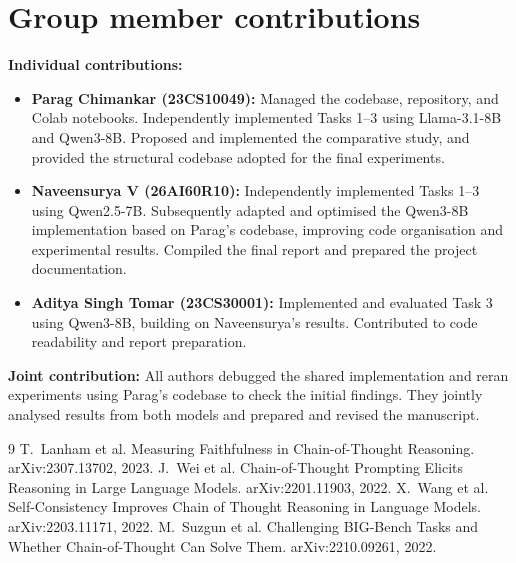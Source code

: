 \documentclass[11pt,a4paper]{article}
\begin{document}
\section*{Group member contributions}
\noindent\textbf{Individual contributions:}
\begin{itemize}
	\item \textbf{Parag Chimankar (23CS10049):} Managed the codebase, repository, and Colab notebooks. Independently implemented Tasks 1--3 using Llama-3.1-8B and Qwen3-8B. Proposed and implemented the comparative study, and provided the structural codebase adopted for the final experiments.
	
	\item \textbf{Naveensurya V (26AI60R10):} Independently implemented Tasks 1--3 using Qwen2.5-7B. Subsequently adapted and optimised the Qwen3-8B implementation based on Parag's codebase, improving code organisation and experimental results. Compiled the final report and prepared the project documentation.
	
	\item \textbf{Aditya Singh Tomar (23CS30001):} Implemented and evaluated Task 3 using Qwen3-8B, building on Naveensurya's results. Contributed to code readability and report preparation.
\end{itemize}
\noindent\textbf{Joint contribution:} All authors debugged the shared implementation and reran experiments using Parag's codebase to check the initial findings. They jointly analysed results from both models and prepared and revised the manuscript.

\begin{thebibliography}{9}
 T.~Lanham et al. Measuring Faithfulness in Chain-of-Thought Reasoning. arXiv:2307.13702, 2023.
 J.~Wei et al. Chain-of-Thought Prompting Elicits Reasoning in Large Language Models. arXiv:2201.11903, 2022.
 X.~Wang et al. Self-Consistency Improves Chain of Thought Reasoning in Language Models. arXiv:2203.11171, 2022.
 M.~Suzgun et al. Challenging BIG-Bench Tasks and Whether Chain-of-Thought Can Solve Them. arXiv:2210.09261, 2022.
\end{thebibliography}

\newpage
\appendix
\end{document}
